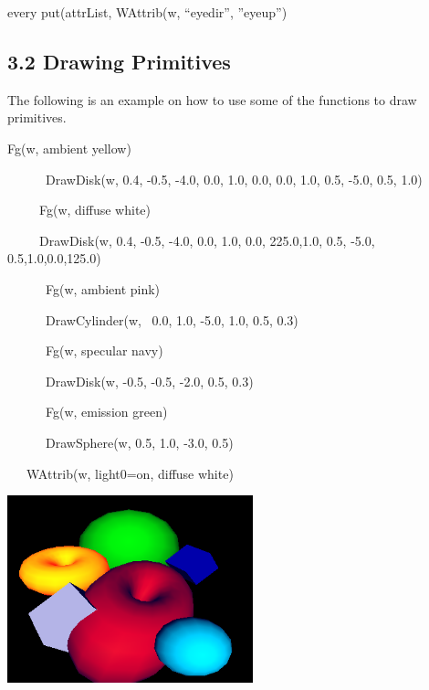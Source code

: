 \documentclass[letterpaper]{article}
\begin{document}
{\sffamily
every put(attrList, WAttrib(w, ``eyedir'', ''eyeup'')}


\subsection[3.2 Drawing Primitives]{3.2 Drawing Primitives}

{
The following is an example on how to use some of the functions to draw primitives. }


\bigskip

{\sffamily
Fg(w, {\textquotedbl}ambient yellow{\textquotedbl})}

{\sffamily
\ \ \ \ \ \ DrawDisk(w, 0.4, -0.5, -4.0, 0.0, 1.0, 0.0, 0.0, 1.0, 0.5, -5.0, 0.5, 1.0) \ \ }

{\sffamily
\ \ \ \ \ Fg(w, {\textquotedbl}diffuse white{\textquotedbl})}

{\sffamily
\ \ \ \ \ DrawDisk(w, 0.4, -0.5, -4.0, 0.0, 1.0, 0.0, 225.0,1.0, 0.5, -5.0, 0.5,1.0,0.0,125.0)}

{\sffamily
\ \ \ \ \ \ Fg(w, {\textquotedbl}ambient pink{\textquotedbl})}

{\sffamily
\ \ \ \ \ \ DrawCylinder(w, \ 0.0, 1.0, -5.0, 1.0, 0.5, 0.3)}

{\sffamily
\ \ \ \ \ \ Fg(w, {\textquotedbl}specular navy{\textquotedbl})}

{\sffamily
\ \ \ \ \ \ DrawDisk(w, -0.5, -0.5, -2.0, 0.5, 0.3)}

{\sffamily
\ \ \ \ \ \ Fg(w, {\textquotedbl}emission green{\textquotedbl})}

{\sffamily
\ \ \ \ \ \ DrawSphere(w, 0.5, 1.0, -3.0, 0.5)}

{\sffamily
\ \ \ WAttrib(w, {\textquotedbl}light0=on, diffuse white{\textquotedbl})}

 \includegraphics[width=2.8071in,height=2.1335in]{utr9/utr9-img021.png} 
\end{document}
